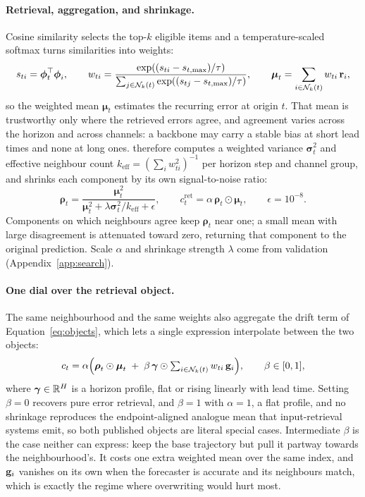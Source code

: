\paragraph{Retrieval, aggregation, and shrinkage.}
Cosine similarity selects the top-$k$ eligible items and a temperature-scaled
softmax turns similarities into weights:
\begin{equation}
  s_{ti}=\boldsymbol{\phi}_t^\top\boldsymbol{\phi}_i,\qquad
  w_{ti}=
  \frac{\exp((s_{ti}-s_{t,\max})/\tau)}
       {\sum_{j\in\mathcal{N}_k(t)}\exp((s_{tj}-s_{t,\max})/\tau)},\qquad
  \boldsymbol{\mu}_t=\sum_{i\in\mathcal{N}_k(t)}w_{ti}\,\mathbf{r}_i ,
  \label{eq:weights}
\end{equation}
so the weighted mean $\boldsymbol{\mu}_t$ estimates the recurring error at origin
$t$. That mean is trustworthy only where the retrieved errors agree, and agreement
varies across the horizon and across channels: a backbone may carry a stable bias
at short lead times and none at long ones. \method{} therefore computes a
weighted variance $\boldsymbol{\sigma}_t^2$ and effective neighbour count
$k_{\mathrm{eff}}=(\sum_i w_{ti}^2)^{-1}$ per horizon step and channel group, and
shrinks each component by its own signal-to-noise ratio:
\begin{equation}
  \boldsymbol{\rho}_t =
  \frac{\boldsymbol{\mu}_t^2}
       {\boldsymbol{\mu}_t^2+\lambda\boldsymbol{\sigma}_t^2/k_{\mathrm{eff}}+\epsilon},
  \qquad
  c_t^{\mathrm{ret}} = \alpha\,\boldsymbol{\rho}_t\odot\boldsymbol{\mu}_t ,
  \qquad \epsilon=10^{-8}.
  \label{eq:shrinkage}
\end{equation}
Components on which neighbours agree keep $\boldsymbol{\rho}_t$ near one; a
small mean with large disagreement is attenuated toward zero, returning that
component to the original prediction. Scale $\alpha$ and shrinkage strength
$\lambda$ come from validation (Appendix~\ref{app:search}).

\paragraph{One dial over the retrieval object.}
The same neighbourhood and the same weights also aggregate the drift term of
Equation~\ref{eq:objects}, which lets a single expression interpolate between the
two objects:
\begin{equation}
  c_t = \alpha\Big(
    \boldsymbol{\rho}_t\odot\boldsymbol{\mu}_t
    \;+\;
    \beta\,\boldsymbol{\gamma}\odot\textstyle\sum_{i\in\mathcal{N}_k(t)} w_{ti}\,\mathbf{g}_i
  \Big),
  \qquad \beta\in[0,1],
  \label{eq:dial}
\end{equation}
where $\boldsymbol{\gamma}\in\mathbb{R}^{H}$ is a horizon profile, flat or rising linearly
with lead time. Setting $\beta=0$ recovers pure error retrieval, and
$\beta=1$ with $\alpha=1$, a flat profile, and no shrinkage reproduces the
endpoint-aligned analogue mean that input-retrieval systems emit, so both
published objects are literal special cases. Intermediate $\beta$ is the case
neither can express: keep the base trajectory but pull it partway towards the
neighbourhood's. It costs one extra weighted mean over the same index, and
$\mathbf{g}_i$ vanishes on its own when the forecaster is accurate and its neighbours
match, which is exactly the regime where overwriting would hurt most.

